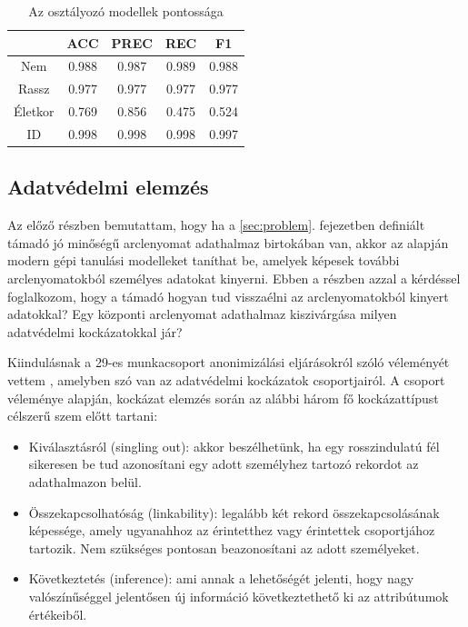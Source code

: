 \begin{table}[ht]
	\centering
	\begin{tabular}{|c|c|c|c|c|}
		\hline
		& ACC & PREC & REC & F1 \\
		\hline
		\hline
		Nem & 0.988 & 0.987 & 0.989 & 0.988 \\
		\hline
		Rassz & 0.977 & 0.977 & 0.977 & 0.977 \\
		\hline
		Életkor & 0.769 & 0.856 & 0.475 & 0.524 \\
		\hline
		ID & 0.998 & 0.998 & 0.998 & 0.997 \\
		\hline
	\end{tabular}
	\caption{Az osztályozó modellek pontossága}
	\label{tab:pontossagok}
\end{table}
 
\subsection{Adatvédelmi elemzés} %
\label{sec:adatvedelmi_elemz}

Az előző részben bemutattam, hogy ha a \ref{sec:problem}. fejezetben definiált támadó jó minőségű arclenyomat adathalmaz birtokában van, akkor az alapján modern gépi tanulási modelleket taníthat be, amelyek képesek további arclenyomatokból személyes adatokat kinyerni. Ebben a részben azzal a kérdéssel foglalkozom, hogy a támadó hogyan tud visszaélni az arclenyomatokból kinyert adatokkal? Egy központi arclenyomat adathalmaz kiszivárgása milyen adatvédelmi kockázatokkal jár?

Kiindulásnak a 29-es munkacsoport anonimizálási eljárásokról szóló véleményét vettem \cite{anon2014}, amelyben szó van az adatvédelmi kockázatok csoportjairól. A csoport véleménye alapján, kockázat elemzés során az alábbi három fő kockázattípust célszerű szem előtt tartani:

\begin{itemize}
	\item Kiválasztásról (singling out): akkor beszélhetünk, ha egy rosszindulatú fél sikeresen be tud azonosítani egy adott személyhez tartozó rekordot az adathalmazon belül.
	\item Összekapcsolhatóság (linkability): legalább két rekord összekapcsolásának képessége, amely ugyanahhoz az érintetthez vagy érintettek csoportjához tartozik. Nem szükséges pontosan beazonosítani az adott személyeket.
	\item Következtetés (inference): ami annak a lehetőségét jelenti, hogy nagy valószínűséggel jelentősen új információ következtethető ki az attribútumok értékeiből.
\end{itemize}

